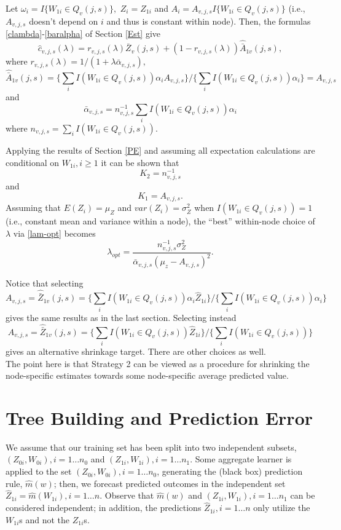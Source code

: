 \documentclass[12pt]{article}
\begin{document}
Let $\omega_i = I\{ W_{1i} \in Q_{v}(j,s) \},$ $Z_i = Z_{1i}$ and $A_i
= A_{v,j,s} I\{ W_{1i} \in Q_{v}(j,s) \}$ (i.e., $A_{v,j,s}$ doesn't
depend on $i$ and thus is constant within node).  Then, the formulas
\eqref{clambda}-\eqref{baralpha} of Section \ref{Est} give
 \[
\widehat{c}_{v,j,s}(\lambda) = r_{v,j,s}(\lambda) \bar{Z}_v(j,s) +
(1-r_{v,j,s}(\lambda)) \hat{\bar{A}}_{1v}(j,s),
\]
where $r_{v,j,s}(\lambda) = 1/(1 + \lambda \bar{\alpha}_{v,j,s}),$
\[
\hat{\bar{A}}_{1v}(j,s) =
\{ \sum_i I(W_{1i} \in Q_{v}(j,s)) \alpha_i  A_{v,j,s}  \}
/ \{ \sum_i I(W_{1i} \in Q_{v}(j,s)) \alpha_i \} = A_{v,j,s}
\]
and
\[
\bar{\alpha}_{v,j,s} =  n^{-1}_{v,j,s} \sum_i I(W_{1i} \in Q_{v}(j,s)) \alpha_i
\]
where $n_{v,j,s} =  \sum_i I( W_{1i} \in Q_{v}(j,s) ).$

Applying the results of Section \ref{PE} and assuming all expectation
calculations are conditional on $W_{1i}, i \geq 1$ it can be shown that
\[
K_2 = n^{-1}_{v,j,s}
\]
and
\[
K_1 = A_{v,j,s}.
\]
Assuming that $E(Z_i) = \mu_Z$ and $var(Z_i) = \sigma^2_Z$ when $I(
W_{1i} \in Q_{v}(j,s) ) =1$ (i.e., constant mean and variance within a
node), the ``best'' within-node choice of $\lambda$ via
\eqref{lam-opt} becomes
\[
\lambda_{opt} = \frac{n^{-1}_{v,j,s} \sigma^2_Z}{ \bar{\alpha}_{v,j,s} (\mu_z -  A_{v,j,s})^2}.
\]

Notice that selecting
\[
A_{v,j,s} = \hat{\bar{Z}}_{1v}(j,s) =
\{ \sum_i I(W_{1i} \in Q_{v}(j,s)) \alpha_i  \hat{Z}_{1i} \}
/ \{ \sum_i I(W_{1i} \in Q_{v}(j,s)) \alpha_i \}
\]
gives the same results as in the last section. Selecting instead
\[
A_{v,j,s} = \hat{\bar{Z}}_{1v}(j,s) =
\{ \sum_i I(W_{1i} \in Q_{v}(j,s))  \hat{Z}_{1i} \}
/ \{ \sum_i I(W_{1i} \in Q_{v}(j,s))  \}
\]
gives an alternative shrinkage target.  There are other choices as well.\\

The point here is that Strategy 2 can be viewed as a procedure for
shrinking the node-specific estimates towards some node-specific
average predicted value.

\section{Tree Building and Prediction Error}
\label{PE-tree}

We assume that our training set has been split into two independent subsets,
$(Z_{0i},W_{0i}), i = 1 \ldots n_0$ and $(Z_{1i}, W_{1i}), i = 1
\ldots n_1$. Some aggregate learner is applied to 
the set $(Z_{0i}, W_{0i}), i = 1 \ldots
n_0$, generating the (black box) prediction rule, $\hat{m}(w)$; then,
we forecast predicted outcomes in the independent set $\widehat{Z}_{1i} =
\hat{m}(W_{1i}), i = 1 \ldots n$.  Observe that $\hat{m}(w)$ and
$(Z_{1i}, W_{1i}), i = 1 \ldots n_1$ can be considered independent; in
addition, the predictions $\widehat{Z}_{1i}, i = 1 \ldots n$ only
utilize the $W_{1i}$s and not the $Z_{1i}$s. 
\end{document}
